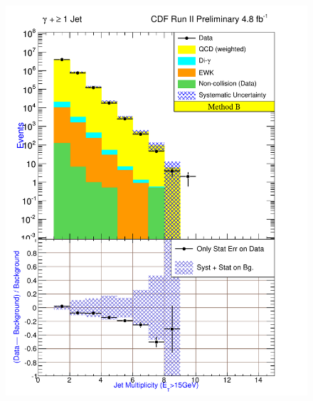\begin{figure}[h!]
{\includegraphics[keepaspectratio=true, scale=\resultsHistScale]{G30Jets_MtdB_plot1_NJet.pdf}}

\end{figure}
